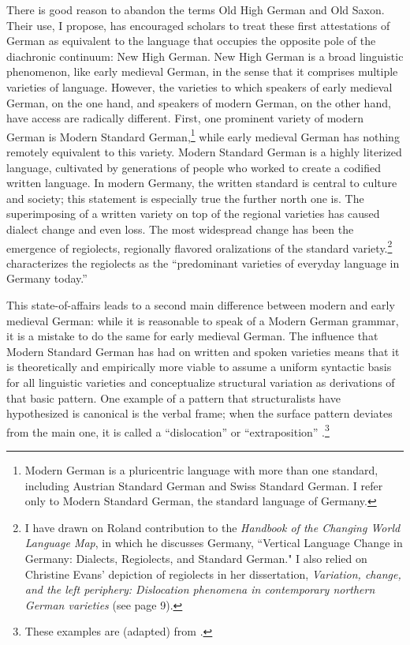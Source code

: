 There is good reason to abandon the terms Old High German and Old Saxon. Their use, I propose, has encouraged scholars to treat these first attestations of German as equivalent to the language that occupies the opposite pole of the diachronic continuum: New High German. New High German is a broad linguistic phenomenon, like early medieval German, in the sense that it comprises multiple varieties of language. However, the varieties to which speakers of early medieval German, on the one hand, and speakers of modern German, on the other hand, have access are radically different. First, one prominent variety of modern German is Modern Standard German,\footnote{Modern German is a pluricentric language with more than one standard, including Austrian Standard German and Swiss Standard German. I refer only to Modern Standard German, the standard language of Germany.} while early medieval German has nothing remotely equivalent to this variety. Modern Standard German is a highly literized language, cultivated by generations of people who worked to create a codified written language. In modern Germany, the written standard is central to culture and society; this statement is especially true the further north one is. The superimposing of a written variety on top of the regional varieties has caused dialect change and even loss. The most widespread change has been the emergence of regiolects, regionally flavored oralizations of the standard variety.\footnote{{I have drawn on Roland  contribution to the} {\textit{Handbook of the Changing World Language Map}}{, in which he discusses Germany, “Vertical Language Change in Germany: Dialects, Regiolects, and Standard German." I also relied on Christine Evans’ depiction of regiolects in her \citeyear{Evans2023} dissertation, \textit{Variation, change, and the left periphery: Dislocation phenomena in contemporary northern German varieties} (see page 9).}} \citet{Kehrein2020} characterizes the regiolects as the “predominant varieties of everyday language in Germany today.”

This state-of-affairs leads to a second main difference between modern and early medieval German: while it is reasonable to speak of a Modern German grammar, it is a mistake to do the same for early medieval German. The influence that Modern Standard German has had on written and spoken varieties means that it is theoretically and empirically more viable to assume a uniform syntactic basis for all linguistic varieties and conceptualize structural variation as derivations of that basic pattern. One example of a pattern that structuralists have hypothesized is canonical is the verbal frame; when the surface pattern deviates from the main one, it is called a  “dislocation” or “extraposition” .\footnote{These examples are (adapted) from \citet[45]{Evans2023}.}


